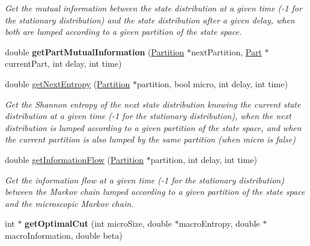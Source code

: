 \begin{DoxyCompactItemize}
\begin{DoxyCompactList}\small\item\em Get the mutual information between the state distribution at a given time (-\/1 for the stationary distribution) and the state distribution after a given delay, when both are lumped according to a given partition of the state space. \end{DoxyCompactList}\item 
\hypertarget{classMarkovProcess_ac0be13af14b988f167b4f89f313603af}{double {\bfseries get\-Part\-Mutual\-Information} (\hyperlink{classPartition}{Partition} $\ast$next\-Partition, \hyperlink{classPart}{Part} $\ast$current\-Part, int delay, int time)}\label{classMarkovProcess_ac0be13af14b988f167b4f89f313603af}

\item 
\hypertarget{classMarkovProcess_a44e748cd2a12c20ec65e4d2c1975518f}{double \hyperlink{classMarkovProcess_a44e748cd2a12c20ec65e4d2c1975518f}{get\-Next\-Entropy} (\hyperlink{classPartition}{Partition} $\ast$partition, bool micro, int delay, int time)}\label{classMarkovProcess_a44e748cd2a12c20ec65e4d2c1975518f}

\begin{DoxyCompactList}\small\item\em Get the Shannon entropy of the next state distribution knowing the current state distribution at a given time (-\/1 for the stationary distribution), when the next distribution is lumped according to a given partition of the state space, and when the current partition is also lumped by the same partition (when micro is false) \end{DoxyCompactList}\item 
\hypertarget{classMarkovProcess_aec53ead60326b0b92d46fe20ad393036}{double \hyperlink{classMarkovProcess_aec53ead60326b0b92d46fe20ad393036}{get\-Information\-Flow} (\hyperlink{classPartition}{Partition} $\ast$partition, int delay, int time)}\label{classMarkovProcess_aec53ead60326b0b92d46fe20ad393036}

\begin{DoxyCompactList}\small\item\em Get the information flow at a given time (-\/1 for the stationary distribution) between the Markov chain lumped according to a given partition of the state space and the microscopic Markov chain. \end{DoxyCompactList}\item 
\hypertarget{classMarkovProcess_a4c8d809c49857400b349016e21aa71b7}{int $\ast$ {\bfseries get\-Optimal\-Cut} (int micro\-Size, double $\ast$macro\-Entropy, double $\ast$macro\-Information, double beta)}\label{classMarkovProcess_a4c8d809c49857400b349016e21aa71b7}


\end{DoxyCompactItemize}
